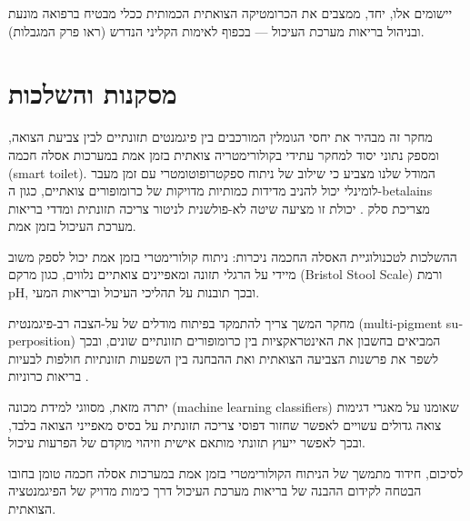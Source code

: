 \begin{hebrew}יישומים אלו, יחד, ממצבים את הכרומטיקה הצואתית הכמותית ככלי מבטיח ברפואה מונעת ובניהול בריאות מערכת העיכול — בכפוף לאימות הקליני הנדרש (ראו פרק המגבלות).\end{hebrew}

\section{\texthebrew{מסקנות והשלכות}}

\begin{hebrew}מחקר זה מבהיר את יחסי הגומלין המורכבים בין פיגמנטים תזונתיים לבין צביעת הצואה, ומספק נתוני יסוד למחקר עתידי בקולורימטריה צואתית בזמן אמת במערכות אסלה חכמה (\textenglish{smart toilet}). המודל שלנו מצביע כי שילוב של ניתוח ספקטרופוטומטרי עם זמן מעבר לומינלי יכול להניב מדידות כמותיות מדויקות של כרומופורים צואתיים, כגון ה-\textenglish{betalains} מצריכת סלק \cite{park2020}. יכולת זו מציעה שיטה לא-פולשנית לניטור צריכה תזונתית ומדדי בריאות מערכת העיכול בזמן אמת.\end{hebrew}

\begin{hebrew}ההשלכות לטכנולוגיית האסלה החכמה ניכרות: ניתוח קולורימטרי בזמן אמת יכול לספק משוב מיידי על הרגלי תזונה ומאפיינים צואתיים נלווים, כגון מרקם (\textenglish{Bristol Stool Scale}) ורמת \textenglish{pH}, ובכך תובנות על תהליכי העיכול ובריאות המעי.\end{hebrew}

\begin{hebrew}מחקר המשך צריך להתמקד בפיתוח מודלים של על-הצבה רב-פיגמנטית (\textenglish{multi-pigment superposition}) המביאים בחשבון את האינטראקציות בין כרומופורים תזונתיים שונים, ובכך לשפר את פרשנות הצביעה הצואתית ואת ההבחנה בין השפעות תזונתיות חולפות לבעיות בריאות כרוניות \cite{clarke2014}.\end{hebrew}

\begin{hebrew}יתרה מזאת, מסווגי למידת מכונה (\textenglish{machine learning classifiers}) שאומנו על מאגרי דגימות צואה גדולים עשויים לאפשר שחזור דפוסי צריכה תזונתית על בסיס מאפייני הצואה בלבד, ובכך לאפשר ייעוץ תזונתי מותאם אישית \cite{zeevi2015, berry2020} וזיהוי מוקדם של הפרעות עיכול.\end{hebrew}

\begin{hebrew}לסיכום, חידוד מתמשך של הניתוח הקולורימטרי בזמן אמת במערכות אסלה חכמה טומן בחובו הבטחה לקידום ההבנה של בריאות מערכת העיכול דרך כימות מדויק של הפיגמנטציה הצואתית.\end{hebrew}


